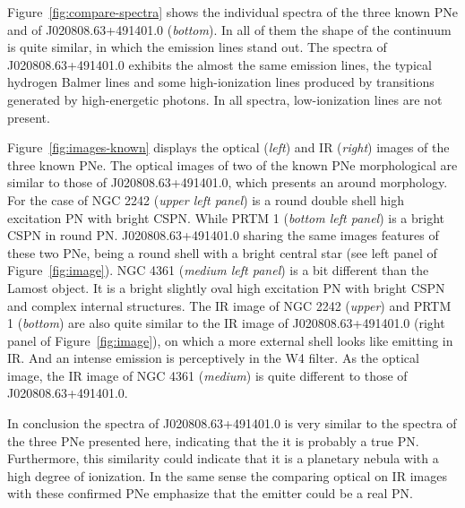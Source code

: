 \documentclass[fleqn,usenatbib]{mnras}
\begin{document}
Figure~\ref{fig:compare-spectra} shows the individual spectra of the three known PNe
and of J020808.63+491401.0 (\textit{bottom}). In all of them the shape of
the continuum is quite similar, in which the emission lines stand out.
The  spectra of J020808.63+491401.0 exhibits the almost the same emission lines,
the typical hydrogen Balmer lines and some high-ionization lines produced by
transitions generated
by high-energetic photons. In all spectra, low-ionization lines are not present.

Figure~\ref{fig:images-known} displays the optical (\textit{left}) and IR (\textit{right})
images of the three known PNe. The optical images of two of the known
PNe morphological are similar to those of J020808.63+491401.0, which presents
an around morphology. For the case of NGC 2242 (\textit{upper left panel}) is a
round double shell high excitation PN with bright CSPN. While  PRTM 1
(\textit{bottom left panel}) is a bright CSPN in round PN. J020808.63+491401.0
sharing the same images features of these two PNe, being a round shell with a bright central star
(see left panel of Figure~\ref{fig:image}). NGC 4361 (\textit{medium left panel}) is a
bit different than the Lamost object. It is a bright slightly oval high excitation PN
with bright CSPN and complex internal structures. The IR image of NGC 2242 (\textit{upper})
and PRTM 1 (\textit{bottom}) are also quite similar to the IR image  of J020808.63+491401.0
(right panel of Figure~\ref{fig:image}), on which a more external shell looks like
emitting in IR. And an intense emission is perceptively in the W4 filter. As the optical
image, the IR image of NGC 4361 (\textit{medium}) is quite different to those
of J020808.63+491401.0.

In conclusion the spectra of J020808.63+491401.0 is very similar to the spectra
of the three PNe presented here, indicating that the it is probably a true PN.
Furthermore, this similarity could indicate that it is a planetary nebula with a
high degree of ionization. In the same sense the comparing optical on IR images
with these confirmed PNe emphasize that the emitter could be a real PN.


\end{document}
